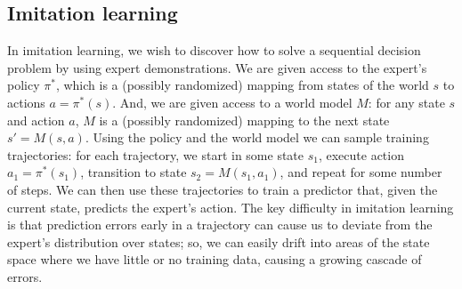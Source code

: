 \documentclass[twoside,11pt]{article}
\begin{document}

\subsection{Imitation learning}

In imitation learning, we wish to discover how to solve a sequential decision problem by using expert demonstrations.  We are given access to the expert's policy $\pi^*$, which is a (possibly randomized) mapping from states of the world $s$ to actions $a=\pi^*(s)$.  And, we are given access to a world model $M$: for any state $s$ and action $a$, $M$ is a (possibly randomized) mapping to the next state $s'=M(s,a)$.
Using the policy and the world model we can sample training trajectories: for each trajectory, we start in some state $s_1$, execute action $a_1=\pi^*(s_1)$, transition to state $s_2=M(s_1,a_1)$, and repeat for some number of steps.  We can then use these trajectories to train a predictor that, given the current state, predicts the expert's action.
The key difficulty in imitation learning is that prediction errors early in a trajectory can cause us to deviate from the expert's distribution over states; so, we can easily drift into areas of the state space where we have little or no training data, causing a growing cascade of errors.
\end{document}
